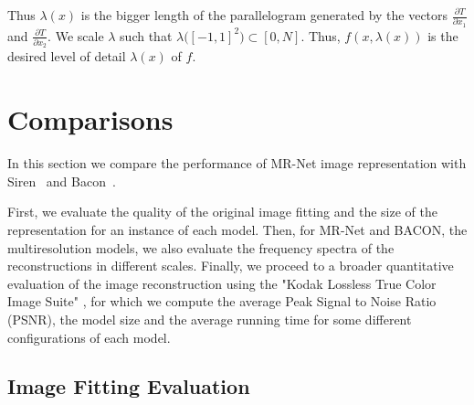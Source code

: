 Thus $\lambda(x)$ is the bigger length of the parallelogram generated by the vectors $\frac{\partial T}{\partial x_1}$ and $\frac{\partial T}{\partial x_2}$. 
We scale $\lambda$ such that $\lambda\big([-1,1]^2\big)\subset[0,N]$.
Thus, $f(x,\lambda(x))$ is the desired level of detail $\lambda(x)$ of $f$.



\section{Comparisons}

%
%
%

In this section we compare the performance of MR-Net image representation with Siren~\cite{sitzmann2019siren} and Bacon~\cite{bacon2021}. 

First, we evaluate the quality of the original image fitting and the size of the representation for an instance of each model. Then, for MR-Net and BACON, the multiresolution models, we also evaluate the frequency spectra of the reconstructions in different scales. Finally, we proceed to a broader quantitative evaluation of the image reconstruction using the "Kodak Lossless True Color Image Suite" \cite{KodakDataset}, for which we compute the average Peak Signal to Noise Ratio (PSNR), the model size and the average running time for some different configurations of each model. 

\subsection{Image Fitting Evaluation}

